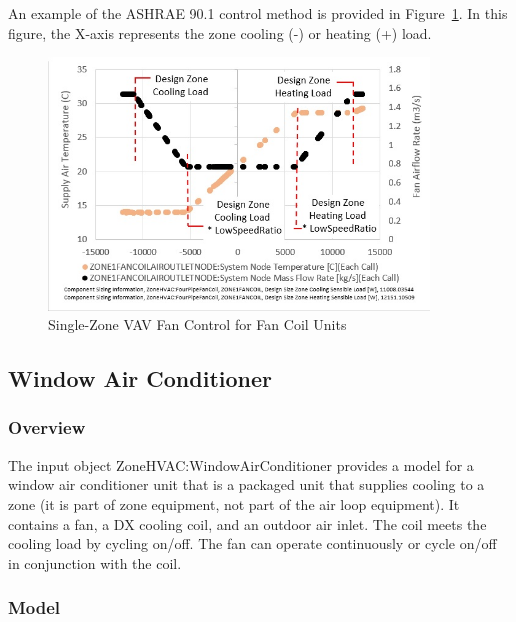An example of the ASHRAE 90.1 control method is provided in Figure~\ref{fig:single-zone-vav-fan-control-for-fan-coil-units}. In this figure, the X-axis represents the zone cooling (-) or heating (+) load.

\begin{figure}[hbtp]
\centering
\includegraphics[width=0.9\textwidth, height=0.9\textheight, keepaspectratio=true]{media/SZVAV_Fan_Control_FanCoil.jpg}
\caption{Single-Zone VAV Fan Control for Fan Coil Units \label{fig:single-zone-vav-fan-control-for-fan-coil-units}}
\end{figure}

\subsection{Window Air Conditioner}\label{window-air-conditioner}

\subsubsection{Overview}\label{overview-5-002}

The input object ZoneHVAC:WindowAirConditioner provides a model for a window air conditioner unit that is a packaged unit that supplies cooling to a zone (it is part of zone equipment, not part of the air loop equipment). It contains a fan, a DX cooling coil, and an outdoor air inlet. The coil meets the cooling load by cycling on/off. The fan can operate continuously or cycle on/off in conjunction with the coil.

\subsubsection{Model}\label{model-4}

